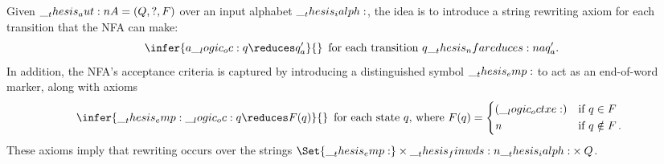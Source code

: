 Given  $\__thesis_aut:n {A} = (Q, ?, F)$ over an input alphabet $\__thesis_ialph:$, the idea is to introduce a string rewriting axiom for each transition that the \ac{NFA} can make:
\begin{equation*}
  \infer{a \oc q \reduces q'_a}{}
  \enspace\text{for each transition $q \nfareduces[a] q'_a$.}
\end{equation*}
In addition, the \ac{NFA}'s acceptance criteria is captured by introducing a distinguished symbol $\__thesis_emp:$ to act as an end-of-word marker, along with axioms
\begin{equation*}
  \infer{\emp \oc q \reduces F(q)}{}
  \enspace\text{for each state $q$, where }
  F(q) = \begin{cases*}
           (\octxe) & if $q \in F$ \\
           \symrej & if $q \notin F$\,.
         \end{cases*}
\end{equation*}
These axioms imply that rewriting occurs over the strings $\Set{\emp} \times \finwds{\ialph} \times Q$.

